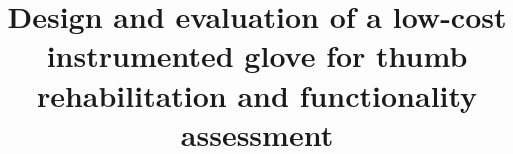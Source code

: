 \documentclass{bmcart}
\begin{document}
\begin{frontmatter}

\begin{fmbox}


\title{Design and evaluation of a low-cost instrumented glove for thumb rehabilitation and functionality assessment}


\author[
   addressref={unisi},                   %
   corref={unisi},                       %
   email={pompili@diism.unisi.it}   %
]{ }
%
\author[
   addressref={unisi,iit},%
   email={lisini@diism.unisi.it}%
]{ }
%
\author[
   addressref={unisi,iit},
   email={scal@diism.unisi.it}
]{ }
%
\author[
   addressref={unisi},
   email={meli@diism.unisi.it}
]{ }
%
\author[
   addressref={unisi,iit},
   email={prattichizzo@diism.unisi.it}
]{ }

\address[id=unisi]{%
  , %
 ,                     %
 ,                              %
}
  

\end{fmbox}
\end{frontmatter}
\end{document}
